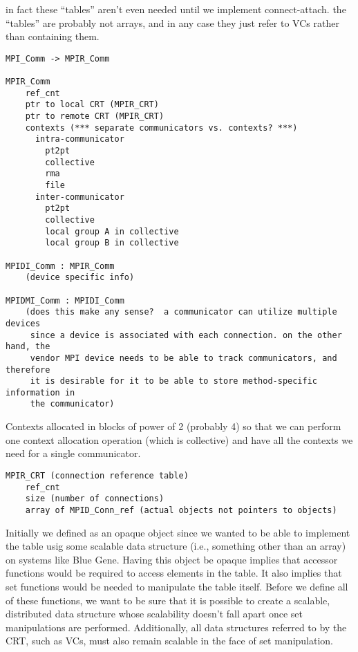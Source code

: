 in fact these ``tables'' aren't even needed until we implement connect-attach.
the ``tables'' are probably not arrays, and in any case they just refer to VCs
rather than containing them.

\begin{verbatim}
MPI_Comm -> MPIR_Comm

MPIR_Comm
    ref_cnt
    ptr to local CRT (MPIR_CRT)
    ptr to remote CRT (MPIR_CRT)
    contexts (*** separate communicators vs. contexts? ***)
      intra-communicator
        pt2pt
        collective
        rma
        file
      inter-communicator
        pt2pt
        collective
        local group A in collective
        local group B in collective

MPIDI_Comm : MPIR_Comm
    (device specific info)

MPIDMI_Comm : MPIDI_Comm
    (does this make any sense?  a communicator can utilize multiple devices
     since a device is associated with each connection. on the other hand, the
     vendor MPI device needs to be able to track communicators, and therefore
     it is desirable for it to be able to store method-specific information in
     the communicator)
\end{verbatim}


Contexts allocated in blocks of power of 2 (probably 4) so that we can perform
one context allocation operation (which is collective) and have all the
contexts we need for a single communicator.

\begin{verbatim}
MPIR_CRT (connection reference table)
    ref_cnt
    size (number of connections)
    array of MPID_Conn_ref (actual objects not pointers to objects)
\end{verbatim}

Initially we defined  as an opaque object since we wanted to be
able to implement the table usig some scalable data structure (i.e., something
other than an array) on systems like Blue Gene.  Having this object be opaque
implies that accessor functions would be required to access elements in the
table.  It also implies that set functions would be needed to manipulate the
table itself.  Before we define all of these functions, we want to be sure that
it is possible to create a scalable, distributed data structure whose
scalability doesn't fall apart once set manipulations are performed.
Additionally, all data structures referred to by the CRT, such as VCs, must
also remain scalable in the face of set manipulation.

